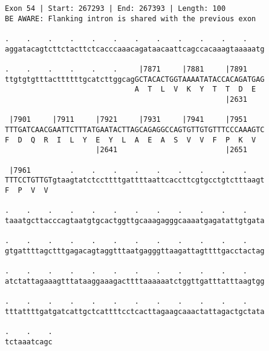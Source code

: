 \documentclass{article}
\begin{document}
\begin{Verbatim}[fontfamily=courier]
Exon 54 | Start: 267293 | End: 267393 | Length: 100
BE AWARE: Flanking intron is shared with the previous exon

.    .    .    .    .    .    .    .    .    .    .    .    
aggatacagtcttctacttctcacccaaacagataacaattcagccacaaagtaaaaatg

.    .    .    .    .    .     |7871     |7881     |7891    
ttgtgtgtttacttttttgcatcttggcagGCTACACTGGTAAAATATACCACAGATGAG
                              A  T  L  V  K  Y  T  T  D  E  
                                                   |2631    

 |7901     |7911     |7921     |7931     |7941     |7951    
TTTGATCAACGAATTCTTTATGAATACTTAGCAGAGGCCAGTGTTGTGTTTCCCAAAGTC
F  D  Q  R  I  L  Y  E  Y  L  A  E  A  S  V  V  F  P  K  V  
                     |2641                         |2651    

 |7961         .    .    .    .    .    .    .    .    .    
TTTCCTGTTGTgtaagtatctccttttgattttaattcaccttcgtgcctgtctttaagt
F  P  V  V                                                  

.    .    .    .    .    .    .    .    .    .    .    .    
taaatgcttacccagtaatgtgcactggttgcaaagagggcaaaatgagatattgtgata

.    .    .    .    .    .    .    .    .    .    .    .    
gtgattttagctttgagacagtaggtttaatgagggttaagattagttttgacctactag

.    .    .    .    .    .    .    .    .    .    .    .    
atctattagaaagtttataaggaaagacttttaaaaaatctggttgatttatttaagtgg

.    .    .    .    .    .    .    .    .    .    .    .    
tttattttgatgatcattgctcattttcctcacttagaagcaaactattagactgctata

.    .    .
tctaaatcagc
\end{Verbatim}
\newpage
\end{document}
